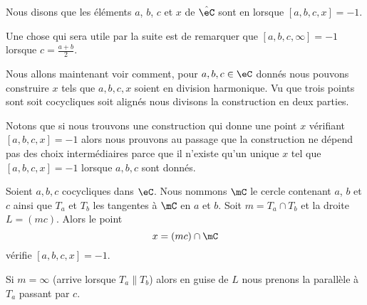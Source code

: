 \begin{definition}
	Nous disons que les éléments \( a\), \( b\), \( c\) et \( x\) de \( \hat \eC\) sont en  lorsque \( [a,b,c,x]=-1\).
\end{definition}

\begin{normaltext}      \label{NORMooUWYDooAZTTWu}
	Une chose qui sera utile par la suite est de remarquer que \( [a,b,c,\infty]=-1\) lorsque \( c=\frac{ a+b }{ 2 }\).
\end{normaltext}

Nous allons maintenant voir comment, pour \( a,b,c\in \eC\) donnés nous pouvons construire \( x\) tels que \( a,b,c,x\) soient en division harmonique. Vu que trois points sont soit cocycliques soit alignés nous divisons la construction en deux parties.

Notons que si nous trouvons une construction qui donne une point \( x\) vérifiant \( [a,b,c,x]=-1\) alors nous prouvons au passage que la construction ne dépend pas des choix intermédiaires parce que il n'existe qu'un unique \( x\) tel que \( [a,b,c,x]=-1\) lorsque \( a,b,c\) sont donnés.

\begin{lemma}     \label{LEMooAEDTooKsUoPw}
	Soient \( a,b,c\) cocycliques dans \( \eC\). Nous nommons \( \mC\) le cercle contenant \( a\), \( b\) et \( c\) ainsi que \( T_a\) et \( T_b\) les tangentes à \( \mC\) en \( a\) et \( b\). Soit \( m=T_a\cap T_b\) et la droite \( L=(mc)\). Alors le point
	\begin{equation}
		x=(mc)\cap \mC
	\end{equation}
	vérifie \( [a,b,c,x]=-1\).

	Si \( m=\infty\) (arrive lorsque \( T_a\parallel T_b\)) alors en guise de \( L\) nous prenons la parallèle à \( T_a\) passant par \( c\).
\end{lemma}

